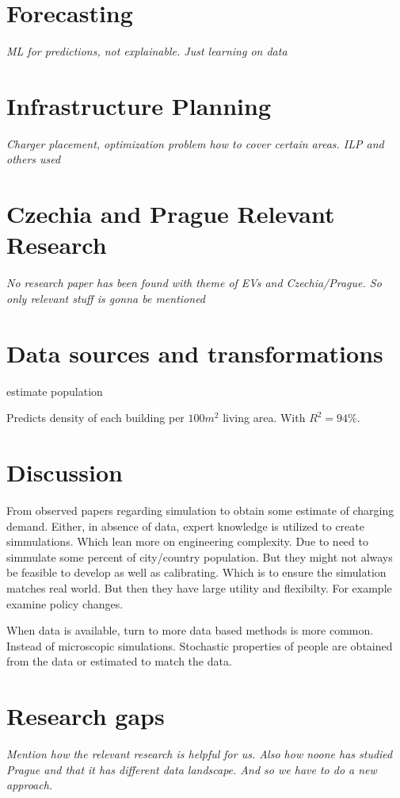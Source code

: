\section{Forecasting}

\textit{ML for predictions, not explainable. Just learning on data}

\section{Infrastructure Planning}

\textit{Charger placement, optimization problem how to cover certain areas. ILP and others used}


\section{Czechia and Prague Relevant Research}

\textit{No research paper has been found with theme of EVs and Czechia/Prague. So only relevant stuff is gonna be mentioned}



\section{Data sources and transformations}
estimate population

Predicts density of each building per $100m^2$ living area. With $R^2 = 94\%$.

\section{Discussion}

From observed papers regarding simulation to obtain some estimate of charging demand. Either, in absence of data, expert knowledge is utilized to create simmulations. Which lean more on engineering complexity. Due to need to simmulate some percent of city/country population. But they might not always be feasible to develop as well as calibrating. Which is to ensure the simulation matches real world. But then they have large utility and flexibilty. For example examine policy changes.

When data is available, turn to more data based methods is more common. Instead of microscopic simulations. Stochastic properties of people are obtained from the data or estimated to match the data.

\section{Research gaps}

\textit{Mention how the relevant research is helpful for us. Also how noone has studied Prague and that it has different data landscape. And so we have to do a new approach.}

